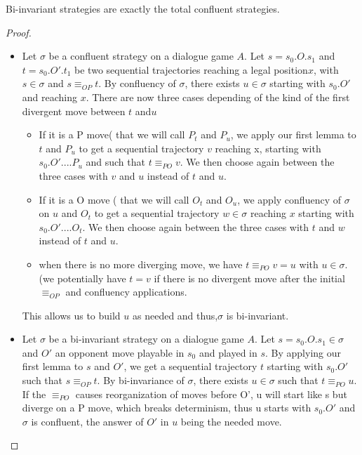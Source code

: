 \documentclass[a4paper,UKenglish]{lipics}
\begin{document}
\begin{theorem}

Bi-invariant strategies are exactly the total confluent strategies.
\end{theorem}
\begin{proof}
\begin{itemize}
\item  Let $\sigma$ be a confluent strategy on a dialogue game $A$. Let $s=s_0.O.s_1$ and $t=s_0.O'.t_1$ be two sequential trajectories reaching a legal position$x$, with $s \in \sigma$ and $s \equiv_{OP} t$. By confluency of $\sigma$, there exists $u \in \sigma$ starting with $s_0.O'$ and reaching $x$. There are now three cases depending of the kind of the first divergent move between $t$ and$u$
\begin{itemize}
\item If it is a P move( that we will call $P_t$ and $P_u$, we apply our first lemma to $t$ and $P_u$ to get a sequential trajectory $v$ reaching x, starting with $s_0.O'....P_u$ and such that $t\equiv_{PO} v$. We then choose again between the three cases with $v$ and $u$ instead of $t$ and $u$. 

\item If it is a O move ( that we will call $O_t$ and $O_u$, we apply confluency of $\sigma$ on $u$ and $O_t$ to get a sequential trajectory $w\in \sigma$ reaching $x$ starting with $s_0.O'....O_t$. We then choose again between the three cases with $t$ and $w$ instead of $t$ and $u$.  
\item when there is no more diverging move, we have $t \equiv_{PO} v=u$  with $u\in \sigma$. (we potentially have $t=v$ if there is no divergent move after the initial $\equiv_{OP}$ and confluency applications.  
\end{itemize}
This allows us to build $u$ as needed and thus,$\sigma$ is bi-invariant.
 
\item Let $\sigma$ be a bi-invariant strategy on a dialogue game $A$. Let $s=s_0.O.s_1\in \sigma$ and $O'$ an opponent move playable in $s_0$ and played in $s$. By applying our first lemma to $s$ and $O'$, we get a sequential trajectory $t$ starting with $s_0.O'$ such that $s\equiv_{OP}t$. By bi-invariance of $\sigma$, there exists $u\in \sigma$ such that $t \equiv_{PO} u$. If the $\equiv_{PO}$ causes reorganization of moves before O', u will start like s but diverge on a P move, which breaks determinism, thus u starts with $s_0.O'$ and $\sigma$ is confluent, the answer of $O'$ in $u$ being the needed move.
 

\end{itemize}
\end{proof}
\end{document}
